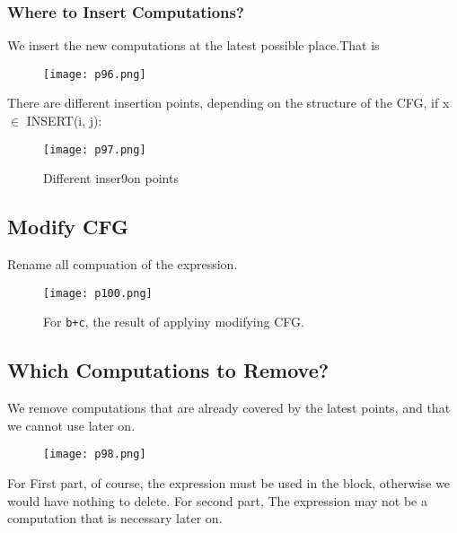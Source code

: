 \subsubsection{Where	to	Insert	Computations?}

We	insert	the	new	computations	at	the	latest	possible	
place.That is 

\begin{figure}[H]
    \centering
     \texttt{[image: p96.png]}
         
         \label{fig:p96}
\end{figure}


There	are	different	insertion	points,	depending	on	the	
structure	of	the	CFG,	if	x $\in$ INSERT(i,	j):	

\begin{figure}[H]
    \centering
     \texttt{[image: p97.png]}
         \caption{	Different	inser9on	points}
         \label{fig:p97}
\end{figure}
\subsection{Modify CFG}

Rename all compuation of the expression.  

\begin{figure}[H]
    \centering
     \texttt{[image: p100.png]}
         \caption{For \texttt{b+c}, the result of applyiny modifying CFG.}
         \label{fig:p100}
\end{figure}


\subsection{Which	Computations	to	Remove?	}
We	remove	computations	that	are	already	covered	by	
the	latest	points,	and	that	we	cannot	use	later	on.	

\begin{figure}[H]
    \centering
     \texttt{[image: p98.png]}
         
         \label{fig:p98}
\end{figure}




For {\color{red} First} part, of	course,	the	expression	
must	be	used	in	the	block,	
otherwise	we	would	have	
nothing	to	delete. For {\color{blue} second} part, The	expression	may	not	be	a	
computation	that	is	necessary	
later	on.	


